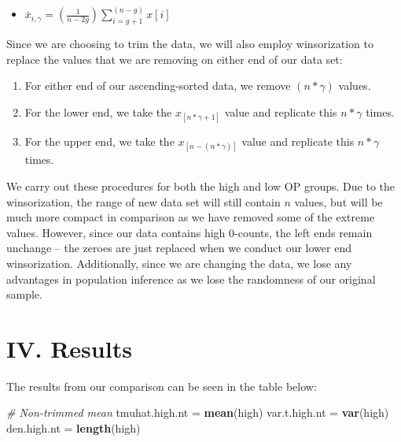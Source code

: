 \documentclass[
]{article}
\newenvironment{Shaded}{\begin{snugshade}}{\end{snugshade}}
\newcommand{\CommentTok}[1]{\textcolor[rgb]{0.56,0.35,0.01}{\textit{#1}}}
\newcommand{\FunctionTok}[1]{\textcolor[rgb]{0.13,0.29,0.53}{\textbf{#1}}}
\newcommand{\NormalTok}[1]{#1}
\newcommand{\OtherTok}[1]{\textcolor[rgb]{0.56,0.35,0.01}{#1}}
\providecommand{\tightlist}{%
  \setlength{\itemsep}{0pt}\setlength{\parskip}{0pt}}
\begin{document}
\begin{itemize}
\tightlist
\item
  \(\bar{x}_{i,\gamma} = (\frac{1}{n-2g})\sum_{i=g+1}^{(n-g)}x[i]\)
\end{itemize}

Since we are choosing to trim the data, we will also employ
winsorization to replace the values that we are removing on either end
of our data set:

\begin{enumerate}
\def\labelenumi{\arabic{enumi}.}
\tightlist
\item
  For either end of our ascending-sorted data, we remove \((n*\gamma)\)
  values.
\item
  For the lower end, we take the \(x_{[n*\gamma + 1]}\) value and
  replicate this \(n*\gamma\) times.
\item
  For the upper end, we take the \(x_{[n-(n*\gamma)]}\) value and
  replicate this \(n*\gamma\) times.
\end{enumerate}

We carry out these procedures for both the high and low OP groups. Due
to the winsorization, the range of new data set will still contain \(n\)
values, but will be much more compact in comparison as we have removed
some of the extreme values. However, since our data contains high
0-counts, the left ends remain unchange -- the zeroes are just replaced
when we conduct our lower end winsorization. Additionally, since we are
changing the data, we lose any advantages in population inference as we
lose the randomness of our original sample.

\section{IV. Results}\label{iv.-results}

The results from our comparison can be seen in the table below:

\begin{Shaded}
\begin{Highlighting}[]
\CommentTok{\# Non{-}trimmed mean}
\NormalTok{tmuhat.high.nt }\OtherTok{=} \FunctionTok{mean}\NormalTok{(high)}
\NormalTok{var.t.high.nt }\OtherTok{=} \FunctionTok{var}\NormalTok{(high)}
\NormalTok{den.high.nt }\OtherTok{=} \FunctionTok{length}\NormalTok{(high)}
\end{Highlighting}
\end{Shaded}
\end{document}
